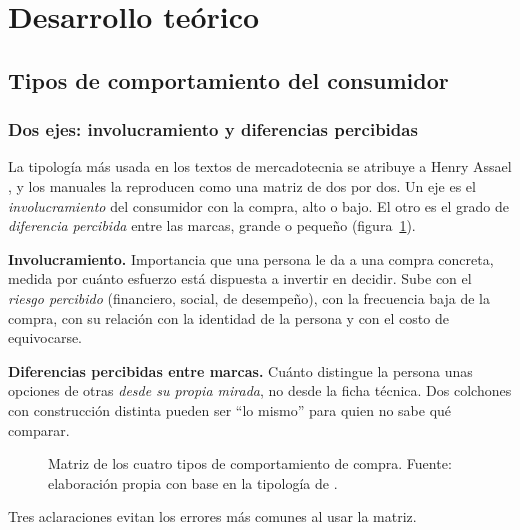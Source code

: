 \section{Desarrollo teórico}

\subsection{Tipos de comportamiento del consumidor}

\subsubsection{Dos ejes: involucramiento y diferencias percibidas}

La tipología más usada en los textos de mercadotecnia se atribuye a Henry
Assael \parencite{assael1987}, y los manuales la reproducen como una matriz de
dos por dos. Un eje es el \emph{involucramiento} del consumidor con la compra,
alto o bajo. El otro es el grado de \emph{diferencia percibida} entre las marcas,
grande o pequeño (figura~\ref{fig:cap09-matriz}).

\begin{cajaDefinicion}
\textbf{Involucramiento.} Importancia que una persona le da a una compra
concreta, medida por cuánto esfuerzo está dispuesta a invertir en decidir. Sube
con el \emph{riesgo percibido} (financiero, social, de desempeño), con la
frecuencia baja de la compra, con su relación con la identidad de la persona y
con el costo de equivocarse.

\textbf{Diferencias percibidas entre marcas.} Cuánto distingue la persona unas
opciones de otras \emph{desde su propia mirada}, no desde la ficha técnica. Dos
colchones con construcción distinta pueden ser \enquote{lo mismo} para quien no
sabe qué comparar.
\end{cajaDefinicion}

\begin{figure}[!htb]
  \centering
  \resizebox{0.9\textwidth}{!}{}
  \caption{Matriz de los cuatro tipos de comportamiento de compra. Fuente:
  elaboración propia con base en la tipología de \textcite{assael1987}.}
  \label{fig:cap09-matriz}
\end{figure}

Tres aclaraciones evitan los errores más comunes al usar la matriz.

